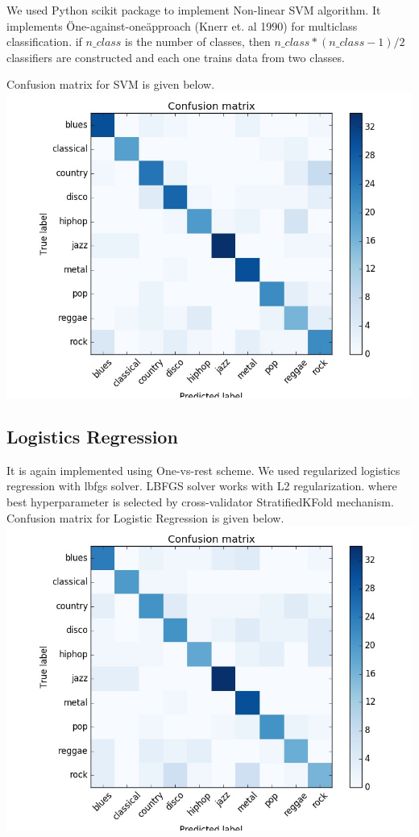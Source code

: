 \documentclass[conference]{IEEEtran}
\begin{document}
We used Python scikit package to implement Non-linear SVM algorithm. It implements \"One-against-one\" approach (Knerr et. al 1990) for multiclass classification. if $n{\_}class$ is the number of classes, then $n{\_}class * (n{\_}class - 1 ) / 2$ classifiers are constructed and each one trains data from two classes.

Confusion matrix for SVM is given below.
\includegraphics[width=\columnwidth]{SVM}

\subsection{Logistics Regression}
\label{sec:Logistics Regression}
It is again implemented using One-vs-rest scheme. We used regularized logistics regression with lbfgs solver. LBFGS solver works with L2 regularization. where best hyperparameter is selected by cross-validator StratifiedKFold mechanism.
Confusion matrix for Logistic Regression is given below.
\includegraphics[width=\columnwidth]{LOGISTIC}
\end{document}
